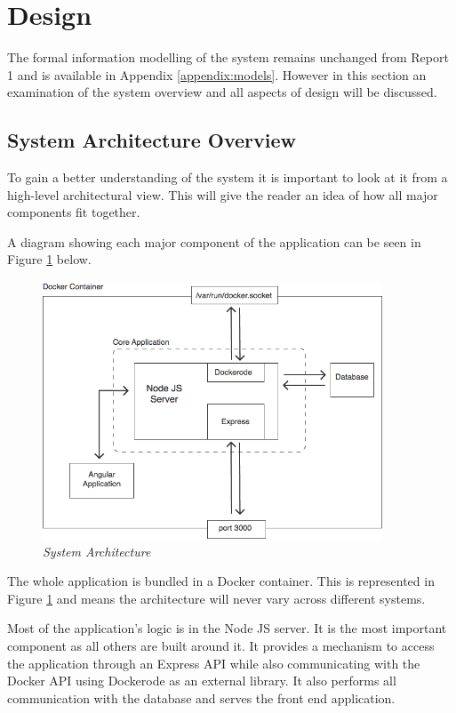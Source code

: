 \section{Design}
\label{sec:design}
The formal information modelling of the system remains unchanged from Report 1 and is available in Appendix \ref{appendix:models}. However in this section an examination of the system overview and all aspects of design will be discussed.

\subsection{System Architecture Overview}
To gain a better understanding of the system it is important to look at it from a high-level architectural view. This will give the reader an idea of how all major components fit together.

A diagram showing each major component of the application can be seen in Figure \ref{fig:architecture} below.

\begin{figure}[!ht]
\centering
\includegraphics*[width=0.9\textwidth]{images/architecture}
\caption{\em System Architecture}
\label{fig:architecture}
\end{figure}

The whole application is bundled in a \gls{Docker container}. This is represented in Figure \ref{fig:architecture} and means the architecture will never vary across different systems.

Most of the application's logic is in the Node JS server. It is the most important component as all others are built around it. It provides a mechanism to access the application through an Express API while also communicating with the Docker API using Dockerode as an external library. It also performs all communication with the database and serves the front end application.


